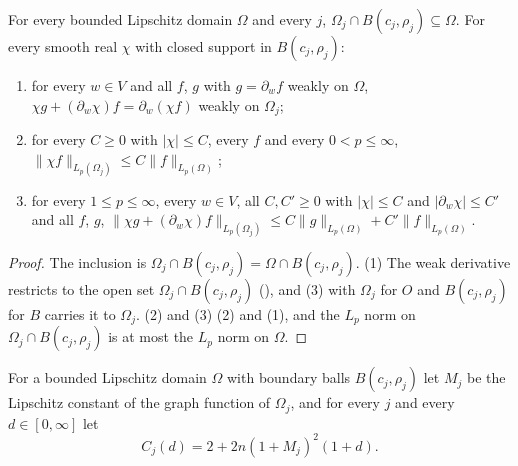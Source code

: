 \begin{lemma}
\label{lem:cutoff-graph-domain}
\leanok
{}
For every bounded Lipschitz domain $\Omega$ and every $j$, $\Omega_j \cap B(c_j, \rho_j)
\subseteq \Omega$. For every smooth real $\chi$ with closed support in $B(c_j, \rho_j)$:
\begin{enumerate}
  \item for every $w \in V$ and all $f$, $g$ with $g = \partial_w f$ weakly on $\Omega$,
    $\chi g + (\partial_w \chi) f = \partial_w (\chi f)$ weakly on $\Omega_j$;
  \item for every $C \geq 0$ with $|\chi| \leq C$, every $f$ and every $0 < p \leq \infty$,
    $\|\chi f\|_{L_p(\Omega_j)} \leq C \|f\|_{L_p(\Omega)}$;
  \item for every $1 \leq p \leq \infty$, every $w \in V$, all $C, C' \geq 0$ with
    $|\chi| \leq C$ and $|\partial_w \chi| \leq C'$ and all $f$, $g$,
    $\|\chi g + (\partial_w \chi) f\|_{L_p(\Omega_j)} \leq C \|g\|_{L_p(\Omega)}
    + C' \|f\|_{L_p(\Omega)}$.
\end{enumerate}
\end{lemma}

\begin{proof}
\leanok
The inclusion is $\Omega_j \cap B(c_j, \rho_j) = \Omega \cap B(c_j, \rho_j)$. (1) The weak
derivative restricts to the open set $\Omega_j \cap B(c_j, \rho_j)$
(), and  (3) with
$\Omega_j$ for
$O$ and $B(c_j, \rho_j)$ for $B$ carries it to $\Omega_j$. (2) and (3)
 (2) and (1), and the $L_p$ norm on
$\Omega_j \cap B(c_j, \rho_j)$ is at most the $L_p$ norm on $\Omega$.
\end{proof}

\begin{definition}
\label{def:reflection-const}
\leanok
{}
For a bounded Lipschitz domain $\Omega$ with boundary balls $B(c_j, \rho_j)$ let $M_j$ be the
Lipschitz constant of the graph function of $\Omega_j$, and for every $j$ and every
$d \in [0, \infty]$ let
\[
  C_j(d) = 2 + 2 n (1 + M_j)^2 (1 + d) .
\]
\end{definition}

